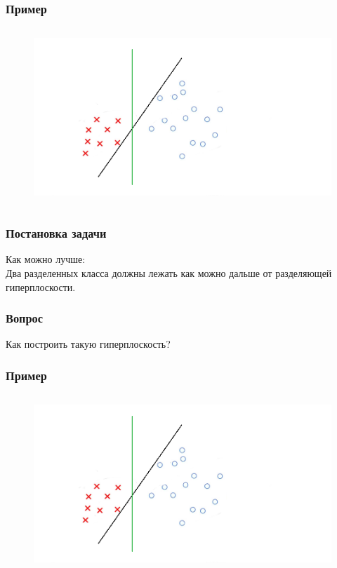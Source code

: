 \documentclass[12pt]{beamer}
\begin{document}
\begin{frame}\frametitle{Пример}
\begin{figure}[htbp]
  \includegraphics[height=190pt, keepaspectratio = true]{images/example}   
\end{figure}
\end{frame}

\begin{frame}\frametitle{Постановка задачи}
Как можно лучше:\\
Два разделенных класса должны лежать как можно дальше от разделяющей гиперплоскости.\\
\end{frame}

\begin{frame}\frametitle{Вопрос}
Как построить такую гиперплоскость?
\end{frame}

\begin{frame}\frametitle{Пример}
\begin{figure}[htbp]
  \includegraphics[height=190pt, keepaspectratio = true]{images/example}   
\end{figure}
\end{frame}
\end{document}
